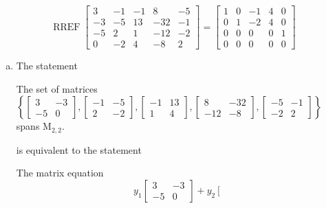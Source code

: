 \begin{exerciseAnswer} 


\[\operatorname{RREF} \left[\begin{array}{ccccc}
3 & -1 & -1 & 8 & -5 \\
-3 & -5 & 13 & -32 & -1 \\
-5 & 2 & 1 & -12 & -2 \\
0 & -2 & 4 & -8 & 2
\end{array}\right] = \left[\begin{array}{ccccc}
1 & 0 & -1 & 4 & 0 \\
0 & 1 & -2 & 4 & 0 \\
0 & 0 & 0 & 0 & 1 \\
0 & 0 & 0 & 0 & 0
\end{array}\right] \]


\begin{enumerate}[(a)]
\item The statement 
\begin{center}\begin{minipage}{0.8\textwidth}
 The set of matrices \( \left\{ \left[\begin{array}{cc}
3 & -3 \\
-5 & 0
\end{array}\right] , \left[\begin{array}{cc}
-1 & -5 \\
2 & -2
\end{array}\right] , \left[\begin{array}{cc}
-1 & 13 \\
1 & 4
\end{array}\right] , \left[\begin{array}{cc}
8 & -32 \\
-12 & -8
\end{array}\right] , \left[\begin{array}{cc}
-5 & -1 \\
-2 & 2
\end{array}\right] \right\} \) spans \(\mathrm{M}_{2,2}\). 
\end{minipage}\end{center}
     is equivalent to the statement 
\begin{center}\begin{minipage}{0.8\textwidth}
 The matrix equation \[ y_{1} \left[\begin{array}{cc}
3 & -3 \\
-5 & 0
\end{array}\right] + y_{2} \left[\begin{array}{cc}

\end{array}\]
\end{minipage}
\end{center}
\end{enumerate}
\end{exerciseAnswer}

